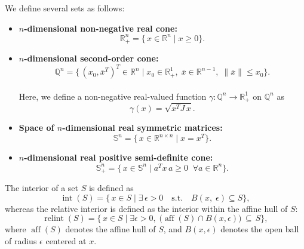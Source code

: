 We define several sets as follows:
\begin{itemize}
    \item 
    \textbf{$n$-dimensional non-negative real cone:} \\
    \[
      \mathbb{R}^n_+ 
      = \{\,x \in \mathbb{R}^n \mid x \geq 0 \}.
    \]

    \item 
    \textbf{$n$-dimensional second-order cone:} \\
    \[
      \mathbb{Q}^n 
      = \{\, (x_0, \bar{x}^T)^T \in \mathbb{R}^n 
         \mid x_0 \in \mathbb{R}^1_+, \; \bar{x} \in \mathbb{R}^{n-1}, \; \|\bar{x}\| \le x_0 \}.
    \]\\
    Here, we define a non-negative real-valued function $\gamma : \mathbb{Q}^n \to \mathbb{R}^1_+$ on $\mathbb{Q}^n$ as
    \[
      \gamma(x) = \sqrt{x^T J\, x}.
    \]

    \item 
    \textbf{Space of $n$-dimensional real symmetric matrices:} \\
    \[
      \mathbb{S}^n = \{\, x \in \mathbb{R}^{n \times n} \mid x = x^T \}.
    \]

    \item 
    \textbf{$n$-dimensional real positive semi-definite cone:} \\
    \[
      \mathbb{S}^n_+ 
      = \{\, x \in \mathbb{S}^n \mid a^T x\, a \ge 0 \;\; \forall a \in \mathbb{R}^n \}.
    \]
\end{itemize}

The interior of a set $S$ is defined as
\[
  \operatorname{int}(S) 
  = \{\, x \in S \mid \exists\, \epsilon > 0 \quad \text{s.t.} \quad B(x,\; \epsilon) \subseteq S \},
\]
whereas the relative interior is defined as the interior within the affine hull of $S$:
\[
\operatorname{relint}(S)
=\{\,
x \in S 
\mid \exists \epsilon>0,\; \bigl(\operatorname{aff}(S)\cap B(x,\epsilon)\bigr)\,\subseteq\,S
\},
\]
where $\operatorname{aff}(S)$ denotes the affine hull of $S$, and $B(x,\epsilon)$ denotes the open ball of radius $\epsilon$ centered at $x$.
